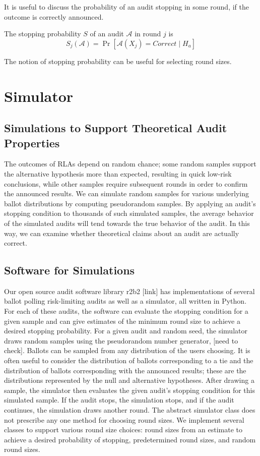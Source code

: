 \documentclass[runningheads]{llncs}
\begin{document}
It is useful to discuss the probability of an audit stopping in
some round, if the outcome is correctly announced.
\begin{definition}
The stopping probability $S$ of an audit $\mathcal{A}$ in round $j$ is 
$$S_j(\mathcal{A})=\Pr[\mathcal{A}(X_j)=Correct \mid H_a]$$
\end{definition}
The notion of stopping probability can be useful for selecting round sizes.

\section{Simulator}
\subsection{Simulations to Support Theoretical Audit Properties}

The outcomes of RLAs depend on random chance; some random samples
support the alternative hypothesis more than expected, resulting in 
quick low-risk conclusions, while other samples require subsequent
rounds in order to confirm the announced results.
We can simulate random samples for various underlying ballot 
distributions by computing pseudorandom samples. 
By applying an audit's stopping condition to thousands of such
simulated samples, the average behavior of the simulated
audits will tend towards the true behavior of the audit.
In this way, we can examine whether theoretical claims about an audit are
actually correct.

\subsection{Software for Simulations}
Our open source audit software library r2b2 [link] has implementations of several ballot polling risk-limiting audits as well as a simulator, 
all written in Python.
For each of these audits, the software can evaluate the stopping condition for a given sample and can give estimates
of the minimum round size to achieve a desired stopping probability. 
For a given audit and random seed, the simulator draws random samples using the pseudorandom number generator, [need to check].
Ballots can be sampled from any distribution of the users choosing. 
It is often useful to consider the distribution of ballots corresponding to a tie and the 
distribution of ballots corresponding with the announced results; these are the distributions represented
by the null and alternative hypotheses.
After drawing a sample, the simulator then evaluates the given audit's stopping condition for this simulated sample.
If the audit stops, the simulation stops, and if the audit continues, the simulation draws another round. 
The abstract simulator class does not prescribe any one method for choosing round sizes. 
We implement several classes to support various round size choices: 
round sizes from an estimate to achieve a desired probability of stopping, 
predetermined round sizes, and random round sizes. 
\end{document}
